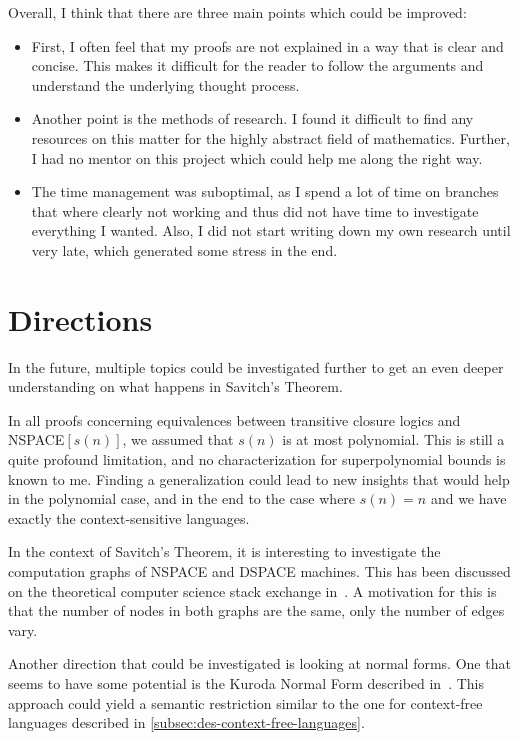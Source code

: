 Overall, I think that there are three main points which could be improved:
\begin{itemize}
    \setlength\itemsep{0.2em}
    \item First, I often feel that my proofs are not explained in a way that is clear and concise.
    This makes it difficult for the reader to follow the arguments and understand the underlying thought process.
    \item Another point is the methods of research.
    I found it difficult to find any resources on this matter for the highly abstract field of mathematics.
    Further, I had no mentor on this project which could help me along the right way.
    \item The time management was suboptimal, as I spend a lot of time on branches that where clearly not working and thus did not have time to investigate everything I wanted.
    Also, I did not start writing down my own research until very late, which generated some stress in the end.
\end{itemize}

\section{Directions}\label{sec:directions}
In the future, multiple topics could be investigated further to get an even deeper understanding on what happens in Savitch's Theorem.

In all proofs concerning equivalences between transitive closure logics and NSPACE$[s(n)]$, we assumed that $s(n)$ is at most polynomial.
This is still a quite profound limitation, and no characterization for superpolynomial bounds is known to me.
Finding a generalization could lead to new insights that would help in the polynomial case, and in the end to the case where $s(n) = n$ and we have exactly the context-sensitive languages.

In the context of Savitch's Theorem, it is interesting to investigate the computation graphs of NSPACE and DSPACE machines.
This has been discussed on the theoretical computer science stack exchange in~\cite{Barak2010}.
A motivation for this is that the number of nodes in both graphs are the same, only the number of edges vary.

Another direction that could be investigated is looking at normal forms.
One that seems to have some potential is the Kuroda Normal Form described in~\cite{Kuroda1964}.
This approach could yield a semantic restriction similar to the one for context-free languages described in \cref{subsec:des-context-free-languages}.

